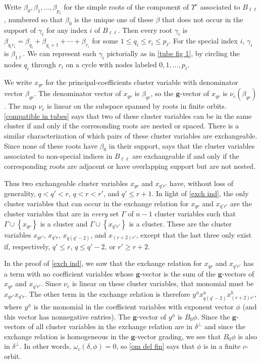 \documentclass{amsart}
\theoremstyle{definition}
\theoremstyle{remark}
\numberwithin{equation}{section}
\newcommand{\set}[1]{{\left\lbrace #1 \right\rbrace}}
\newcommand{\0}{{\mathbf{0}}}
\newcommand{\g}{\mathbf{g}}
\newcommand{\RSTChar}{\Upsilon}
\newcommand{\RST}[1]{\RSTChar^{#1}}
\begin{document}
Write $\beta_0,\beta_1,\ldots,\beta_{p_\ell}$ for the simple roots of the component of $\RST{c}$ associated to $B_{\ell\ell}$, numbered so that $\beta_0$ is the unique one of these $\beta$ that does not occur in the support of $\gamma_i$ for any index $i$ of $B_{\ell\ell}$. 
Then every root $\gamma_i$ is $\beta_{q_ir_i}=\beta_{q_i}+\beta_{q_i+1}+\cdots+\beta_{r_i}$ for some $1\le q_i\le r_i\le p_\ell$.
For the special index $i$, $\gamma_i$ is $\beta_{1\ell}$.
We can represent each $\gamma_i$ pictorially as in \cref{tube fig 1}, by circling the nodes $q_i$ through $r_i$ on a cycle with nodes labeled $0,1,\ldots,p_\ell$.

We write $x_{qr}$ for the principal-coefficients cluster variable with denominator vector $\beta_{qr}$.
The denominator vector of $x_{qr}$ is $\beta_{qr}$, so the $\g$-vector of $x_{qr}$ is $\nu_c(\beta_{qr})$.
The map $\nu_c$ is linear on the subspace spanned by roots in finite orbits.
\cref{compatible in tubes} says that two of these cluster variables can be in the same cluster if and only if the corresonding roots are nested or spaced.
There is a similar characterization of which pairs of these cluster variables are exchangeable.
Since none of these roots have $\beta_0$ in their support, \cite[Theorem~7.2]{affdenom} says that the cluster variables associated to non-special indices in $B_{\ell\ell}$ are exchangeable if and only if the corresponding roots are adjacent or have overlapping support but are not nested.

Thus two exchangeable cluster variables $x_{qr}$ and $x_{q'r'}$ have, without loss of generality, $q<q'<r$, $q<r<r'$, and $q'\le r+1$.
In light of \cref{exch ind}, the only cluster variables that can occur in the exchange relation for $x_{qr}$ and $x_{q'r'}$ are the cluster variables that are in \emph{every} set $\Gamma$ of $n-1$ cluster variables such that $\Gamma\cup\set{x_{qr}}$ is a cluster and $\Gamma\cup\set{x_{q'r'}}$ is a cluster.
These are the cluster variables $x_{qr'}$, $x_{q'r}$, $x_{q(q'-2)}$, and $x_{(r+2)r'}$, except that the last three only exist if, respectively, $q'\le r$, $q\le q'-2$, or $r'\ge r+2$.

In the proof of \cref{exch ind}, we saw that the exchange relation for $x_{qr}$ and $x_{q'r'}$ has a term with no coefficient variables whose $\g$-vector is the sum of the $\g$-vectors of $x_{qr}$ and $x_{q'r'}$.
Since $\nu_c$ is linear on these cluster variables, that monomial must be $x_{qr'}x_{q'r}$.
The other term in the exchange relation is therefore $y^\phi x_{q(q'-2)}^ax_{(r+2)r'}^b$, where $y^\phi$ is the monomial in the coefficient variables with exponent vector $\phi$ (and this vector has nonnegative entries).
The $\g$-vector of $y^\phi$ is $B_0\phi$.
Since the $\g$-vectors of all cluster variables in the exchange relation are in $\delta^\perp$ and since the exchange relation is homogeneous in the $\g$-vector grading, we see that $B_0\phi$ is also in $\delta^\perp$.
In other words, $\omega_c(\delta,\phi)=0$, so \cref{om del fin} says that $\phi$ is in a finite $c$-orbit.
\end{document}
